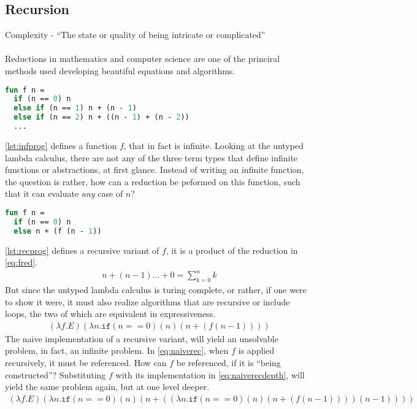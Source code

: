 \documentclass[11pt,oneside,a4paper]{report}
\begin{document}
\subsection{Recursion}
Complexity - ``The state or quality of being intricate or complicated''
\\\\
\noindent Reductions in mathematics and computer science are one of the princiral methods used developing beautiful equations and algorithms.
\begin{lstlisting}[language=ML,caption={Infinite program},label={lst:infprog}]
fun f n = 
  if (n == 0) n
  else if (n == 1) n + (n - 1)
  else if (n == 2) n + ((n - 1) + (n - 2))
  ...
\end{lstlisting}
\autoref{lst:infprog} defines a function $f$, that in fact is infinite.
Looking at the untyped lambda calculus, there are not any of the three term types that define infinite functions or abstractions, at first glance.
Instead of writing an infinite function, the question is rather, how can a reduction be peformed on this function, such that it can evaluate \textit{any} case of $n$?
\begin{lstlisting}[language=ML,caption={Recursive program},label={lst:recprog}]
fun f n = 
  if (n == 0) n
  else n + (f (n - 1))
\end{lstlisting}
\autoref{lst:recprog} defines a recursive variant of $f$, it is a product of the reduction in \autoref{eq:fred}.
\begin{align}
    n + (n - 1) \dots + 0 = \sum_{k = 0}^n k
    \label{eq:fred}
\end{align}
But since the untyped lambda calculus is turing complete, or rather, if one were to show it were,
it must also realize algorithms that are recursive or include loops, the two of which are equivalent in expressiveness.
\begin{align}
    (\lambda f . E) (\lambda n . \texttt{if} (n == 0) (n) (n + (f (n - 1))))
    \label{eq:naiverec}
\end{align}
The naive implementation of a recursive variant, will yield an unsolvable problem, in fact, an infinite problem.
In \autoref{eq:naiverec}, when $f$ is applied recursively, it must be referenced.
How can $f$ be referenced, if it is ``being constructed''?
Substituting $f$ with its implementation in \autoref{eq:naiverecdepth}, will yield the same problem again, but at one level deeper.
\begin{align}
    (\lambda f . E) (\lambda n . \texttt{if} (n == 0) (n) (n + ((\lambda n . \texttt{if} (n == 0) (n) (n + (f (n - 1)))) (n - 1))))
    \label{eq:naiverecdepth}
\end{align}
\end{document}
